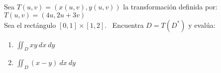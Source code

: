 Sea $T(u, v) = (x(u, v), y(u, v))$ la transformación definida por:
\\$T(u, v) = (4u, 2u+3v)$ 
\\Sea el rectángulo $[0,1] \times [1,2].$ \ Encuentra $D = T(D^*)$ y evalúa:

\begin{enumerate}[label=(\alph*), itemsep=0.4em, topsep=0.5em]
	\item $\displaystyle \iint_D xy \ dx \ dy$
	\item $\displaystyle \iint_D (x-y) \ dx \ dy$
\end{enumerate}
